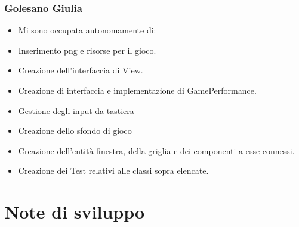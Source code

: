 \subsubsection{Golesano Giulia}
\begin{itemize}
    \item Mi sono occupata autonomamente di:
    \item Inserimento png e risorse per il gioco.
    \item Creazione dell'interfaccia di View.
    \item Creazione di interfaccia e implementazione di GamePerformance.
    \item Gestione degli input da tastiera
    \item Creazione dello sfondo di gioco
    \item Creazione dell'entità finestra, della griglia e dei componenti a esse connessi.
    \item Creazione dei Test relativi alle classi sopra elencate.
\end{itemize}

\section{Note di sviluppo}
